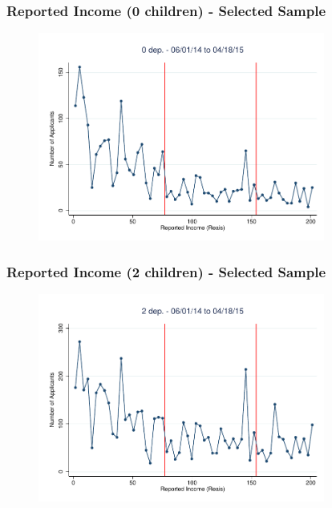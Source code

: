 \documentclass[xcolor=pdftex,dvipsnames,table]{beamer}
\begin{document}
\appendix
{}
\setcounter{finalframe}{\value{framenumber}}

\begin{frame}[label=ybar0_sel]
\frametitle{Reported Income  (0 children) - Selected Sample}
\begin{figure}[H]
\begin{center}
\includegraphics[height=2.7in]{Dom1_060114_non_0_bin3p5.pdf}
\end{center}
\end{figure}
\hyperlink{ybar0}{}
\end{frame}

\begin{frame}[label=ybar2_sel]
\frametitle{Reported Income (2 children) - Selected Sample}
\begin{figure}[H]
\begin{center}
\includegraphics[height=2.7in]{Dom1_060114_non_2_bin3p5.pdf}
\end{center}
\end{figure}
\hyperlink{ybar2}{}
\end{frame}
\end{document}
